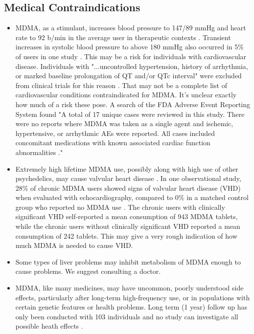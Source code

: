 \documentclass[12pt,letterpaper]{book}
\begin{document}
\subsection*{Medical Contraindications}
\begin{itemize}
    \item MDMA, as a stimulant, increases blood pressure to 147/89 mmHg and heart rate to 92 b/min in the average user in therapeutic contexts \cite{mitchellMDMAClinicalTrial}. Transient increases in systolic blood pressure to above 180 mmHg also occurred in 5\% of users in one study \cite{vizeliActuteEffects}. This may be a risk for individuals with cardiovascular disease. Individuals with "...uncontrolled hypertension, history of arrhythmia, or marked baseline prolongation of QT and/or QTc interval" were excluded from clinical trials for this reason \cite{mitchellMDMAClinicalTrial2}. That may not be a complete list of cardiovascular conditions contraindicated for MDMA. It's unclear exactly how much of a risk these pose. A search of the FDA Adverse Event Reporting System found "A total of 17 unique cases were reviewed in this study. There were no reports where MDMA was taken as a single agent and ischemic, hypertensive, or arrhythmic AEs were reported. All cases included concomitant medications with known associated cardiac function abnormalities \cite{makunts2023concomitant}."
    \item Extremely high lifetime MDMA use, possibly along with high use of other psychedelics, may cause valvular heart disease \cite{droogmans2007valvular,tagen2023valvular}. In one observational study, 28\% of chronic MDMA users showed signs of valvular heart disease (VHD) when evaluated with echocardiography, compared to 0\% in a matched control group who reported no MDMA use \cite{droogmans2007valvular}. The chronic users with clinically significant VHD self-reported a mean consumption of 943 MDMA tablets, while the chronic users without clinically significant VHD reported a mean consumption of 242 tablets. This may give a very rough indication of how much MDMA is needed to cause VHD.
    \item Some types of liver problems may inhibit metabolism of MDMA enough to cause problems. We suggest consulting a doctor.
    \item MDMA, like many medicines, may have uncommon, poorly understood side effects, particularly after long-term high-frequency use, or in populations with certain genetic features or health problems. Long term (1 year) follow up has only been conducted with 103 individuals and no study can investigate all possible heath effects \cite{jeromeMDMALongTerm}.

\end{itemize}
\end{document}

